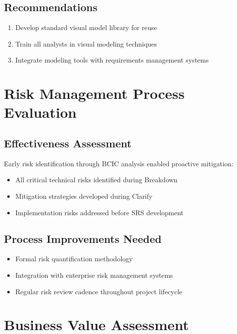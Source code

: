 \documentclass[12pt,a4paper]{article}
\begin{document}
\subsection{Recommendations}
\begin{enumerate}
    \item Develop standard visual model library for reuse
    \item Train all analysts in visual modeling techniques
    \item Integrate modeling tools with requirements management systems
\end{enumerate}

\section{Risk Management Process Evaluation}

\subsection{Effectiveness Assessment}
Early risk identification through BCIC analysis enabled proactive mitigation:
\begin{itemize}
    \item All critical technical risks identified during Breakdown
    \item Mitigation strategies developed during Clarify
    \item Implementation risks addressed before SRS development
\end{itemize}

\subsection{Process Improvements Needed}
\begin{itemize}
    \item Formal risk quantification methodology
    \item Integration with enterprise risk management systems
    \item Regular risk review cadence throughout project lifecycle
\end{itemize}

\section{Business Value Assessment}
\end{document}
